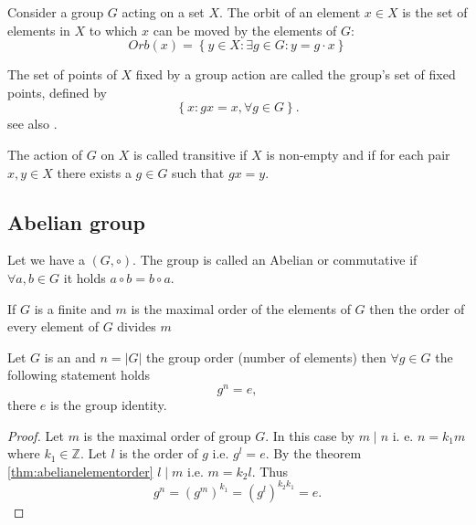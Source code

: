 \begin{appendices}
\begin{definition}[Orbit]
  Consider \cite{wiki:groupaction} a group $G$ acting on a set
  $X$. The orbit of an element $x \in X$ 
  is the set of elements in $X$ to which $x$ can be moved by the elements
  of $G$:
  \[
  Orb\left(x\right) = \left\{y \in X: \exists g \in G: y = g \cdot x \right\}
  \]
  \label{def:orbit}
\end{definition}

\begin{definition}
  The set of points of $X$ fixed by a group action are called the
  group's set of fixed points, defined by
  \[
  \left\{
  x: g x = x, \forall g \in G
  \right\}.
  \]
  see also \cite{mathworld:groupfixedpoint}. 
  \label{def:fixedpoint}
\end{definition}

\begin{definition}
  The action of $G$ on $X$ is called \cite{wiki:groupaction}
  transitive if $X$ is non-empty and if for each pair $x, y \in X$ there
  exists a $g \in G$ such that $gx = y$.
  \label{def:transitive}
\end{definition}

\subsection{Abelian group}

\begin{definition}
  Let we have a  $\left(G, \circ\right)$.
  The group is called an Abelian or commutative if
  $\forall a, b \in G$ it holds $a \circ b = b \circ a$.
  \label{def:abeliangroup}
\end{definition}

\begin{theorem}
  If $G$ is a finite  and $m$ is the maximal
  order of the elements of $G$ then the order of every element of $G$
  divides $m$ 
  \label{thm:abelianelementorder}
\end{theorem}

\begin{theorem}
  Let $G$ is an  and $n = \left|G\right|$
  the group order (number of elements) then $\forall g \in G$ the
  following statement holds
  \[
  g^n = e,
  \]
  there $e$ is the group identity.
  \begin{proof}
    Let $m$ is the maximal order of group $G$. In this case by
     $m \mid n$ i. e. $n = k_1 m$ where $k_1 \in
    \mathbb{Z}$. Let $l$ is the order of $g$ i.e. $g^l = e$. By the
    theorem \ref{thm:abelianelementorder} $l \mid m$ i.e. $m = k_2
    l$. Thus
    \[
    g^n = \left(g^m\right)^{k_1} = 
    \left(g^l\right)^{k_2 k_1} = e.
    \]
  \end{proof}
  \label{thm:abelianelement}
\end{theorem}


\end{appendices}
